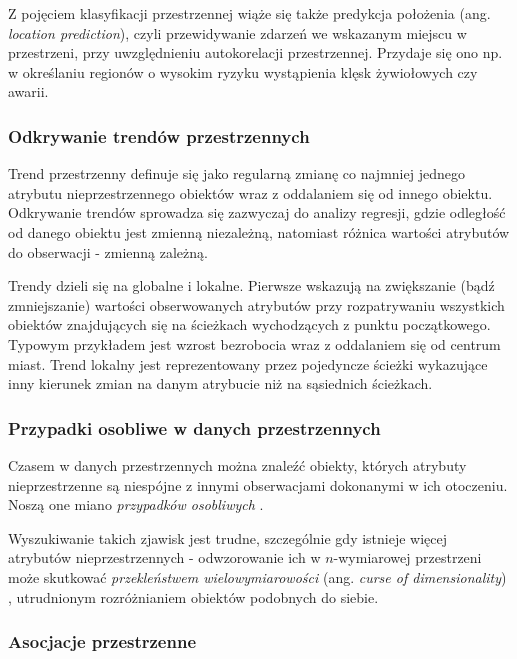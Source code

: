 \documentclass[12pt]{article}
\begin{document}
Z pojęciem klasyfikacji przestrzennej wiąże się także predykcja położenia (ang. \textit{location prediction}), czyli przewidywanie zdarzeń we wskazanym miejscu w przestrzeni, przy uwzględnieniu autokorelacji przestrzennej. Przydaje się ono np. w określaniu regionów o wysokim ryzyku wystąpienia klęsk żywiołowych czy awarii.

\subsubsection{Odkrywanie trendów przestrzennych}

Trend przestrzenny definuje się \cite{toptrendy} jako regularną zmianę co najmniej jednego atrybutu nieprzestrzennego obiektów wraz z oddalaniem się od innego obiektu. Odkrywanie trendów sprowadza się zazwyczaj do analizy regresji, gdzie odległość od danego obiektu jest zmienną niezależną, natomiast różnica wartości atrybutów do obserwacji - zmienną zależną.

Trendy dzieli się na globalne i lokalne. Pierwsze wskazują na zwiększanie (bądź zmniejszanie) wartości obserwowanych atrybutów przy rozpatrywaniu wszystkich obiektów znajdujących się na ścieżkach wychodzących z punktu początkowego. Typowym przykładem jest wzrost bezrobocia wraz z oddalaniem się od centrum miast. Trend lokalny jest reprezentowany przez pojedyncze ścieżki wykazujące inny kierunek zmian na danym atrybucie niż na sąsiednich ścieżkach.

\subsubsection{Przypadki osobliwe w danych przestrzennych}

Czasem w danych przestrzennych można znaleźć obiekty, których atrybuty nieprzestrzenne są niespójne z innymi obserwacjami dokonanymi w ich otoczeniu. Noszą one miano \textit{przypadków osobliwych} \cite{przypadeg}. 

Wyszukiwanie takich zjawisk jest trudne, szczególnie gdy istnieje więcej atrybutów nieprzestrzennych - odwzorowanie ich w $n$-wymiarowej przestrzeni może skutkować \textit{przekleństwem wielowymiarowości} (ang. \textit{curse of dimensionality}) \cite{kurwa}, utrudnionym rozróżnianiem obiektów podobnych do siebie.

\subsubsection{Asocjacje przestrzenne}
\end{document}
